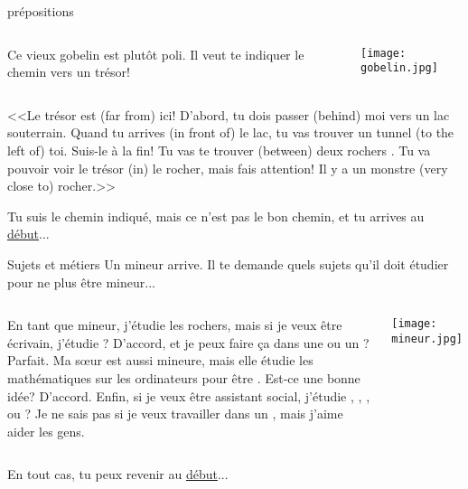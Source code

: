 \documentclass{beamer}
\begin{document}
  \begin{frame}{prépositions}
    \hypertarget{prépositions}{}
    \begin{columns}
        Ce vieux gobelin est plutôt poli.
        Il veut te indiquer le chemin vers un trésor!
        \begin{center}
          \texttt{[image: gobelin.jpg]}
        \end{center}
    \end{columns}

    \vspace{0.25cm}
    <<Le trésor est \underline{} (far from) ici!
    D'abord, tu dois passer \underline{} (behind) moi vers un lac souterrain.
    Quand tu arrives \underline{} (in front of) le lac, tu vas trouver un tunnel \underline{} (to the left of) toi.
    Suis-le à la fin!
    Tu vas te trouver \underline{} (between) deux rochers .
    Tu va pouvoir voir le trésor \underline{} (in) le rocher, mais fais attention!
    Il y a un monstre \underline{} (very close to) rocher.>>

    \vspace{0.25cm}
    Tu suis le chemin indiqué, mais ce n'est pas le bon chemin, et tu arrives au \hyperlink{début}{début}...
  \end{frame}

  \begin{frame}{Sujets et métiers}
    \hypertarget{sujets}{}
    Un mineur arrive.
    Il te demande quels sujets qu'il doit étudier pour ne plus être mineur...

    \vspace{0.25cm}
    \begin{columns}
        \small
        En tant que mineur, j'étudie les rochers, mais si je veux être écrivain, j'étudie \underline{}?
        D'accord, et je peux faire ça dans une \underline{} ou un \underline{}?
        Parfait.
        Ma sœur est aussi mineure, mais elle étudie les mathématiques sur les ordinateurs pour être \underline{}.
        Est-ce une bonne idée?
        D'accord.
        Enfin, si je veux être assistant social, j'étudie \underline{}, \underline{}, \underline{}, ou \underline{}?
        Je ne sais pas si je veux travailler dans un \underline{}, mais j'aime aider les gens.

        \begin{center}
          \texttt{[image: mineur.jpg]}
        \end{center}
    \end{columns}
    \vspace{0.25cm}
    En tout cas, tu peux revenir au \hyperlink{début}{début}...
  \end{frame}
\end{document}
